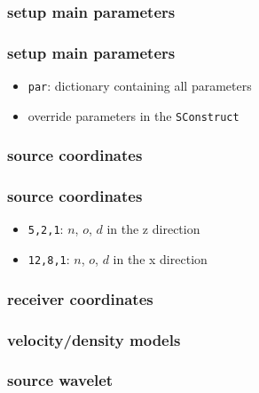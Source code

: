 \begin{frame} \frametitle{setup main parameters}
\end{frame}
\cwpnote{}

\begin{frame} \frametitle{setup main parameters}
  \begin{itemize}
  \item \texttt{par}: dictionary containing all parameters
  \item override parameters in the \texttt{SConstruct}
  \end{itemize}
\end{frame}
\cwpnote{}

\begin{frame} \frametitle{source coordinates}
\end{frame}
\cwpnote{}

\begin{frame} \frametitle{source coordinates}
 \begin{itemize}
  \item \texttt{5,2,1}: $n$, $o$, $d$ in the z direction
  \item \texttt{12,8,1}: $n$, $o$, $d$ in the x direction
  \end{itemize}
\end{frame}
\cwpnote{}

\begin{frame} \frametitle{receiver coordinates}
\end{frame}
\cwpnote{}

\begin{frame} \frametitle{velocity/density models}
\end{frame}
\cwpnote{}
\begin{frame}  \end{frame} \cwpnote{}

\begin{frame} \frametitle{source wavelet}
\end{frame}
\cwpnote{}
\begin{frame}  \end{frame} \cwpnote{}

